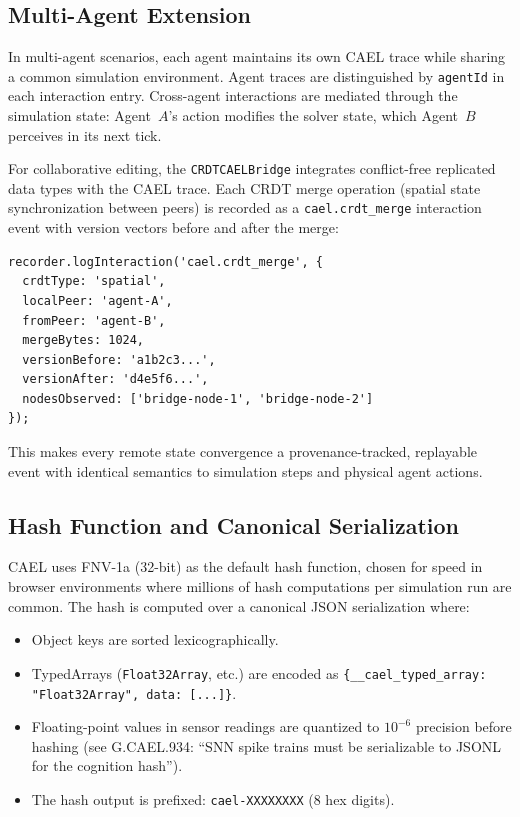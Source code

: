 \documentclass[sigconf,nonacm]{acmart}
\begin{document}
\subsection{Multi-Agent Extension}

In multi-agent scenarios, each agent maintains its own CAEL trace
while sharing a common simulation environment. Agent traces are
distinguished by \texttt{agentId} in each interaction entry.
Cross-agent interactions are mediated through the simulation
state: Agent~$A$'s action modifies the solver state, which
Agent~$B$ perceives in its next tick.

For collaborative editing, the \texttt{CRDTCAELBridge} integrates
conflict-free replicated data types with the CAEL trace. Each
CRDT merge operation (spatial state synchronization between peers)
is recorded as a \texttt{cael.crdt\_merge} interaction event with
version vectors before and after the merge:

\begin{lstlisting}[caption={CRDT merge as CAEL interaction},label=lst:crdt]
recorder.logInteraction('cael.crdt_merge', {
  crdtType: 'spatial',
  localPeer: 'agent-A',
  fromPeer: 'agent-B',
  mergeBytes: 1024,
  versionBefore: 'a1b2c3...',
  versionAfter: 'd4e5f6...',
  nodesObserved: ['bridge-node-1', 'bridge-node-2']
});
\end{lstlisting}

This makes every remote state convergence a provenance-tracked,
replayable event with identical semantics to simulation steps
and physical agent actions.

\subsection{Hash Function and Canonical Serialization}
\label{sec:architecture:hash}

CAEL uses FNV-1a (32-bit) as the default hash function, chosen for
speed in browser environments where millions of hash computations
per simulation run are common. The hash is computed over a canonical
JSON serialization where:

\begin{itemize}
  \item Object keys are sorted lexicographically.
  \item TypedArrays (\texttt{Float32Array}, etc.) are encoded as
    \texttt{\{\_\_cael\_typed\_array: "Float32Array", data: [...]\}}.
  \item Floating-point values in sensor readings are quantized to
    $10^{-6}$ precision before hashing (see G.CAEL.934:
    ``SNN spike trains must be serializable to JSONL for the
    cognition hash'').
  \item The hash output is prefixed: \texttt{cael-XXXXXXXX} (8 hex digits).
\end{itemize}
\end{document}
